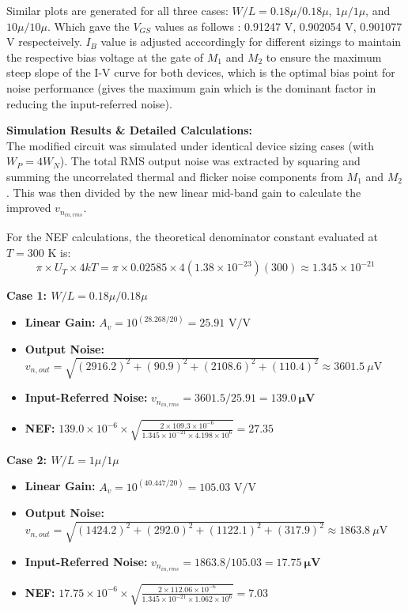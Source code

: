 \documentclass[12pt, a4paper]{article}
\begin{document}
Similar plots are generated for all three cases: $W/L = 0.18\mu/0.18\mu$, $1\mu/1\mu$, and $10\mu/10\mu$. Which gave the $V_{GS}$ values as follows : 0.91247 V, 0.902054 V, 0.901077 V respecteively. $I_{B}$ value is adjusted acccordingly for different sizings to maintain the respective bias voltage at the gate of $M_1$ and $M_2$ to ensure the maximum steep slope of the I-V curve for both devices, which is the optimal bias point for noise performance (gives the maximum gain which is the dominant factor in reducing the input-referred noise). 

\vspace{0.3cm}
\textbf{Simulation Results \& Detailed Calculations:} \\
The modified circuit was simulated under identical device sizing cases (with $W_P = 4 W_N$). The total RMS output noise was extracted by squaring and summing the uncorrelated thermal and flicker noise components from $M_1$ and $M_2$. This was then divided by the new linear mid-band gain to calculate the improved $v_{n_{in,rms}}$. 

For the NEF calculations, the theoretical denominator constant evaluated at $T=300\text{ K}$ is:
\begin{equation}
    \pi \times U_T \times 4kT = \pi \times 0.02585 \times 4(1.38\times 10^{-23})(300) \approx 1.345 \times 10^{-21}
\end{equation}

\textbf{Case 1: $W/L = 0.18\mu / 0.18\mu$}
\begin{itemize}
    \item \textbf{Linear Gain:} $A_v = 10^{(28.268/20)} = 25.91\text{ V/V}$
    \item \textbf{Output Noise:} $v_{n,out} = \sqrt{(2916.2)^2 + (90.9)^2 + (2108.6)^2 + (110.4)^2} \approx 3601.5\ \mu\text{V}$
    \item \textbf{Input-Referred Noise:} $v_{n_{in,rms}} = 3601.5 / 25.91 = \mathbf{139.0\ \mu\text{V}}$
    \item \textbf{NEF:} $139.0\times 10^{-6} \times \sqrt{\frac{2 \times 109.3\times 10^{-6}}{1.345\times 10^{-21} \times 4.198\times 10^6}} = \mathbf{27.35}$
\end{itemize}

\textbf{Case 2: $W/L = 1\mu / 1\mu$}
\begin{itemize}
    \item \textbf{Linear Gain:} $A_v = 10^{(40.447/20)} = 105.03\text{ V/V}$
    \item \textbf{Output Noise:} $v_{n,out} = \sqrt{(1424.2)^2 + (292.0)^2 + (1122.1)^2 + (317.9)^2} \approx 1863.8\ \mu\text{V}$
    \item \textbf{Input-Referred Noise:} $v_{n_{in,rms}} = 1863.8 / 105.03 = \mathbf{17.75\ \mu\text{V}}$
    \item \textbf{NEF:} $17.75\times 10^{-6} \times \sqrt{\frac{2 \times 112.06\times 10^{-6}}{1.345\times 10^{-21} \times 1.062\times 10^6}} = \mathbf{7.03}$
\end{itemize}
\end{document}
